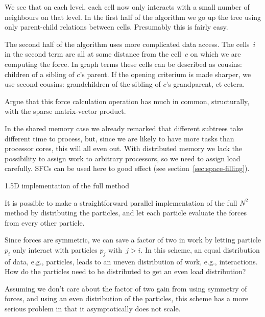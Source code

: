 We see that on each level, each cell now only interacts with a small
number of neighbours on that level. In the first half of the algorithm
we go up the tree using only parent-child relations between
cells. Presumably this is fairly easy.

The second half of the algorithm uses more complicated data
access. The cells~$i$ in the second term are all at some distance from
the cell~$c$ on which we are computing the force. In graph terms these
cells can be described as cousins: children of a sibling of $c$'s
parent. If the opening criterium is made sharper, we use second
cousins: grandchildren of the sibling of $c$'s grandparent, et cetera.


\begin{exercise}
  Argue that this force calculation operation has much in common,
  structurally, with the sparse matrix-vector product.
\end{exercise}

In the shared memory case we already remarked that different subtrees
take different time to process, but, since we are likely to have more
tasks than processor cores, this will all even out. With distributed
memory we lack the possibility to assign work to arbitrary processors,
so we need to assign load carefully. \acfp{SFC} can be used here 
to good effect (see section~\ref{sec:space-filling}).

 {1.5D implementation of the full method}

It is possible to make a straightforward parallel implementation of
the full $N^2$ method by distributing the particles, and let each
particle evaluate the forces from every other particle.

\begin{exercise}
  Since forces are symmetric, we can save a factor of two in
  work by letting particle $p_i$ only interact with particles $p_j$
  with~$j>i$. In this scheme, an equal distribution of data, e.g.,
  particles, leads to an uneven distribution of work, e.g.,
  interactions. How do the particles need to be distributed to get an
  even load distribution?
\end{exercise}

Assuming we don't care about the factor of two gain from using
symmetry of forces, and using an even distribution of the particles,
this scheme has a more serious problem in that it asymptotically does
not scale.




